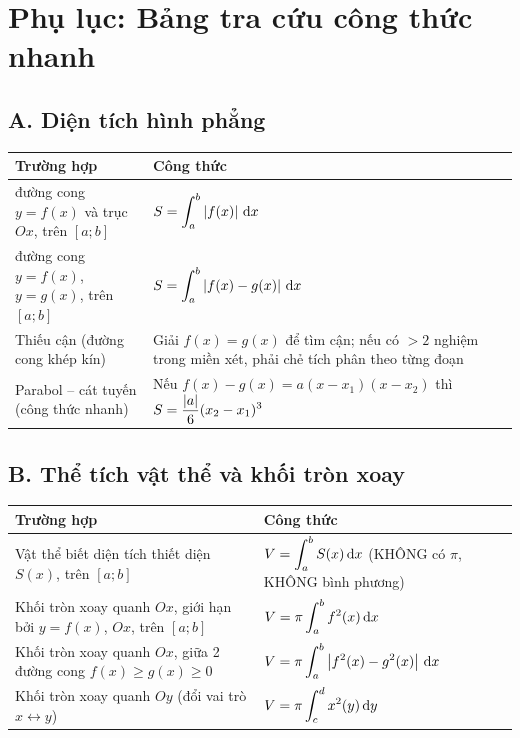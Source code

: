 \clearpage
\section*{Phụ lục: Bảng tra cứu công thức nhanh}

\subsection*{A. Diện tích hình phẳng}

\begin{hopdinhly}
\renewcommand{\arraystretch}{2.0}
\begin{tabular}{>{\raggedright\arraybackslash}p{5.5cm}>{\raggedright\arraybackslash}p{7.5cm}}
\textbf{Trường hợp} & \textbf{Công thức} \\
\hline
1 đường cong $y=f(x)$ và trục $Ox$, trên $[a;b]$ &
$\displaystyle S=\int_a^b \left| f(x) \right|\,\mathrm{d}x$ \\
2 đường cong $y=f(x)$, $y=g(x)$, trên $[a;b]$ &
$\displaystyle S=\int_a^b \left| f(x)-g(x) \right|\,\mathrm{d}x$ \\
Thiếu cận (đường cong khép kín) &
Giải $f(x)=g(x)$ để tìm cận; nếu có $>2$ nghiệm trong miền xét, phải chẻ tích phân theo từng đoạn \\
Parabol -- cát tuyến (công thức nhanh) &
Nếu $f(x)-g(x)=a(x-x_1)(x-x_2)$ thì $\displaystyle S=\frac{\left| a \right|}{6}(x_2-x_1)^3$ \\
\end{tabular}
\end{hopdinhly}

\subsection*{B. Thể tích vật thể và khối tròn xoay}

\begin{hopdinhly}
\renewcommand{\arraystretch}{2.0}
\begin{tabular}{>{\raggedright\arraybackslash}p{5.5cm}>{\raggedright\arraybackslash}p{7.5cm}}
\textbf{Trường hợp} & \textbf{Công thức} \\
\hline
Vật thể biết diện tích thiết diện $S(x)$, trên $[a;b]$ &
$\displaystyle V=\int_a^b S(x)\,\mathrm{d}x$ \quad (KHÔNG có $\pi$, KHÔNG bình phương) \\
Khối tròn xoay quanh $Ox$, giới hạn bởi $y=f(x)$, $Ox$, trên $[a;b]$ &
$\displaystyle V=\pi\int_a^b f^2(x)\,\mathrm{d}x$ \\
Khối tròn xoay quanh $Ox$, giữa 2 đường cong $f(x)\ge g(x)\ge0$ &
$\displaystyle V=\pi\int_a^b\left| f^2(x)-g^2(x) \right|\,\mathrm{d}x$ \\
Khối tròn xoay quanh $Oy$ (đổi vai trò $x\leftrightarrow y$) &
$\displaystyle V=\pi\int_c^d x^2(y)\,\mathrm{d}y$ \\
\end{tabular}
\end{hopdinhly}

